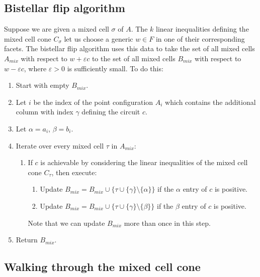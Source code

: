 \documentclass[a4paper,12pt]{article}
\begin{document}
\subsection{Bistellar flip algorithm}
Suppose we are given a mixed cell $\sigma$ of $A$. The $k$ linear inequalities defining the mixed cell cone $C_\sigma$ let us choose a generic $w \in F$ in one of their corresponding facets. The bistellar flip algorithm uses this data to take the set of all mixed cells $A_{mix}$ with respect to $w + \varepsilon c$ to the set of all mixed cells $B_{mix}$ with respect to $w - \varepsilon c$, where $\varepsilon > 0$ is sufficiently small. To do this:
\begin{enumerate}
	\item Start with empty $B_{mix}$.
	\item Let $i$ be the index of the point configuration $A_i$ which contains the additional column with index $\gamma$ defining the circuit $c$.
	\item Let $\alpha = a_i$, $\beta = b_i$.
	\item Iterate over every mixed cell $\tau$ in $A_{mix}$:
	\begin{enumerate} 
	\item If $c$ is achievable by considering the linear inequalities of the mixed cell cone $C_\tau$, then execute: \begin{enumerate}
	\item Update $B_{mix} = B_{mix} \cup \{ \tau \cup \{\gamma\} \setminus \{\alpha\} \}$ if the $\alpha$ entry of $c$ is positive.
	\item Update $B_{mix} = B_{mix} \cup \{ \tau \cup \{\gamma\} \setminus \{\beta\} \}$ if the $\beta$ entry of $c$ is positive.
	\end{enumerate}
	Note that we can update $B_{mix}$ more than once in this step.
	 \end{enumerate}
	 \item Return $B_{mix}$.
\end{enumerate}

\newpage

\subsection{Walking through the mixed cell cone}
\end{document}
